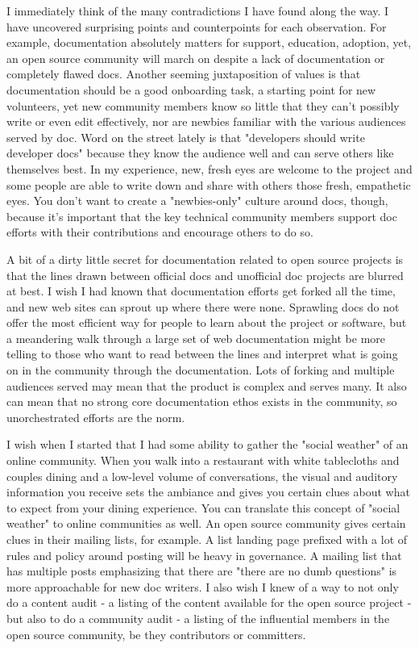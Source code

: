 I immediately think of the many contradictions I have found along the way. I have uncovered surprising points and counterpoints for each observation. For example, documentation absolutely matters for support, education, adoption, yet, an open source community will march on despite a lack of documentation or completely flawed docs. Another seeming juxtaposition of values is that documentation should be a good onboarding task, a starting point for new volunteers, yet new community members know so little that they can't possibly write or even edit effectively, nor are newbies familiar with the various audiences served by doc. Word on the street lately is that "developers should write developer docs" because they know the audience well and can serve others like themselves best. In my experience, new, fresh eyes are welcome to the project and some people are able to write down and share with others those fresh, empathetic eyes. You don't want to create a "newbies-only" culture around docs, though, because it's important that the key technical community members support doc efforts with their contributions and encourage others to do so. 

A bit of a dirty little secret for documentation related to open source projects is that the lines drawn between official docs and unofficial doc projects are blurred at best. I wish I had known that documentation efforts get forked all the time, and new web sites can sprout up where there were none. Sprawling docs do not offer the most efficient way for people to learn about the project or software, but a meandering walk through a large set of web documentation might be more telling to those who want to read between the lines and interpret what is going on in the community through the documentation. Lots of forking and multiple audiences served may mean that the product is complex and serves many. It also can mean that no strong core documentation ethos exists in the community, so unorchestrated efforts are the norm. 

I wish when I started that I had some ability to gather the "social weather" of an online community. When you walk into a restaurant with white tablecloths and couples dining and a low-level volume of conversations, the visual and auditory information you receive sets the ambiance and gives you certain clues about what to expect from your dining experience. You can translate this concept of "social weather" to online communities as well. An open source community gives certain clues in their mailing lists, for example. A list landing page prefixed with a lot of rules and policy around posting will be heavy in governance. A mailing list that has multiple posts emphasizing that there are "there are no dumb questions" is more approachable for new doc writers. I also wish I knew of a way to not only do a content audit - a listing of the content available for the open source project - but also to do a community audit - a listing of the influential members in the open source community, be they contributors or committers. 

